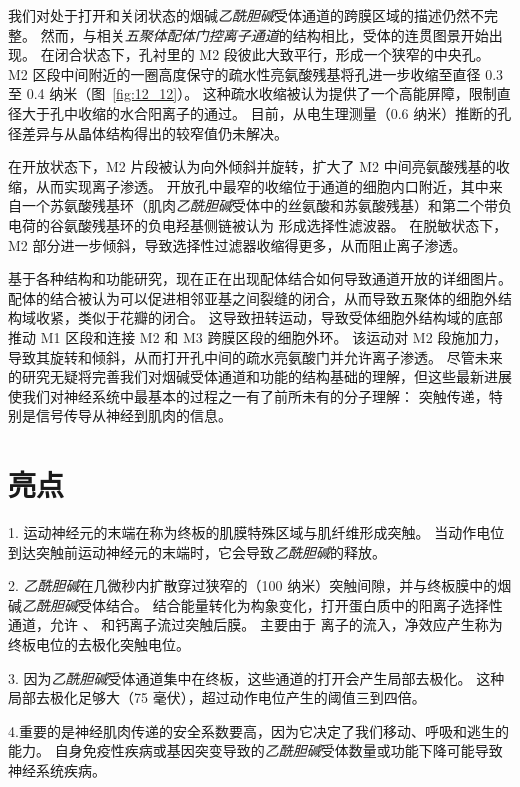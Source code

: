 我们对处于打开和关闭状态的烟碱\textit{乙酰胆碱}受体通道的跨膜区域的描述仍然不完整。
然而，与相关\textit{五聚体配体门控离子通道}的结构相比，受体的连贯图景开始出现。
在闭合状态下，孔衬里的 M2 段彼此大致平行，形成一个狭窄的中央孔。
M2 区段中间附近的一圈高度保守的疏水性亮氨酸残基将孔进一步收缩至直径 0.3 至 0.4 纳米（图~\ref{fig:12_12}）。
这种疏水收缩被认为提供了一个高能屏障，限制直径大于孔中收缩的水合阳离子的通过。
目前，从电生理测量（0.6 纳米）推断的孔径差异与从晶体结构得出的较窄值仍未解决。


在开放状态下，M2 片段被认为向外倾斜并旋转，扩大了 M2 中间亮氨酸残基的收缩，从而实现离子渗透。
开放孔中最窄的收缩位于通道的细胞内口附近，其中来自一个苏氨酸残基环（肌肉\textit{乙酰胆碱}受体中的丝氨酸和苏氨酸残基）和第二个带负电荷的谷氨酸残基环的负电羟基侧链被认为 形成选择性滤波器。
在脱敏状态下，M2 部分进一步倾斜，导致选择性过滤器收缩得更多，从而阻止离子渗透。


基于各种结构和功能研究，现在正在出现配体结合如何导致通道开放的详细图片。
配体的结合被认为可以促进相邻亚基之间裂缝的闭合，从而导致五聚体的细胞外结构域收紧，类似于花瓣的闭合。
这导致扭转运动，导致受体细胞外结构域的底部推动 M1 区段和连接 M2 和 M3 跨膜区段的细胞外环。
该运动对 M2 段施加力，导致其旋转和倾斜，从而打开孔中间的疏水亮氨酸门并允许离子渗透。
尽管未来的研究无疑将完善我们对烟碱受体通道和功能的结构基础的理解，但这些最新进展使我们对神经系统中最基本的过程之一有了前所未有的分子理解：
突触传递，特别是信号传导从神经到肌肉的信息。



\section{亮点}

1. 运动神经元的末端在称为终板的肌膜特殊区域与肌纤维形成突触。
当动作电位到达突触前运动神经元的末端时，它会导致\textit{乙酰胆碱}的释放。 


2. \textit{乙酰胆碱}在几微秒内扩散穿过狭窄的（100 纳米）突触间隙，并与终板膜中的烟碱\textit{乙酰胆碱}受体结合。
结合能量转化为构象变化，打开蛋白质中的阳离子选择性通道，允许 、 和钙离子流过突触后膜。
主要由于  离子的流入，净效应产生称为终板电位的去极化突触电位。 


3. 因为\textit{乙酰胆碱}受体通道集中在终板，这些通道的打开会产生局部去极化。
这种局部去极化足够大（75 毫伏），超过动作电位产生的阈值三到四倍。 


4.重要的是神经肌肉传递的安全系数要高，因为它决定了我们移动、呼吸和逃生的能力。
自身免疫性疾病或基因突变导致的\textit{乙酰胆碱}受体数量或功能下降可能导致神经系统疾病。 


